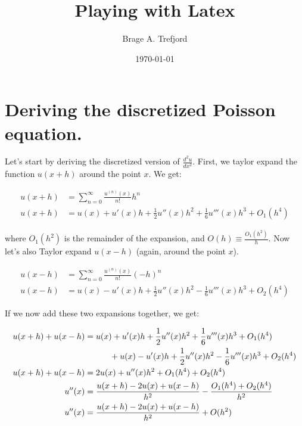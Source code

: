 \documentclass[english,notitlepage]{revtex4-1}  %
\begin{document}
\title{Playing with Latex}      %
\author{Brage A. Trefjord}          %
\date{\today}                             %
\noaffiliation                            %

\maketitle

\section{Deriving the discretized Poisson equation.}

Let's start by deriving the discretized version of $\frac{d^2u}{dx^2}$. First,
we taylor expand the function $u(x+h)$ around the point $x$. We get:

\begin{align*}
    u(x+h) &= \sum_{n=0}^{\infty} \frac{u^{(n)}(x)}{n!} h^n
    \\
    u(x+h) &= u(x) + u'(x) h + \frac{1}{2} u''(x) h^2 + \frac{1}{6} u'''(x) h^3 + O_1(h^4)
\end{align*}

where $O_1(h^2)$ is the remainder of the expansion, and $O(h) \equiv
\frac{O_1(h^2)}{h}$. Now let's also Taylor expand $u(x-h)$ (again, around the
point $x$).

\begin{align*}
    u(x-h) &= \sum_{n=0}^{\infty} \frac{u^{(n)}(x)}{n!} (-h)^n
    \\
    u(x-h) &= u(x) - u'(x) h + \frac{1}{2} u''(x) h^2 - \frac{1}{6} u'''(x) h^3 + O_2(h^4)
\end{align*}

If we now add these two expansions together, we get:

\begin{align*}
    u(x+h) + u(x-h) &= u(x) + u'(x) h + \frac{1}{2} u''(x) h^2 + \frac{1}{6} u'''(x) h^3
    + O_1(h^4) 
    \\ & \hspace*{30pt} + u(x) - u'(x) h + \frac{1}{2} u''(x) h^2 - \frac{1}{6} u'''(x) h^3 + O_2(h^4)
    \\
    u(x+h) + u(x-h) &= 2u(x) + u''(x) h^2 + O_1(h^4) + O_2(h^4)
    \\
    u''(x) &= \frac{u(x+h) - 2u(x) + u(x-h)}{h^2} - \frac{O_1(h^4) + O_2(h^4)}{h^2}
    \\
    u''(x) &= \frac{u(x+h) - 2u(x) + u(x-h)}{h^2} + O(h^2)
\end{align*}
\end{document}
